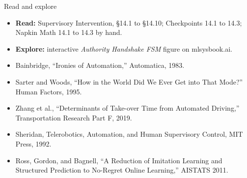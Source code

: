 \documentclass[aspectratio=169, 12pt]{beamer}
\begin{document}
\begin{frame}{Read and explore}
  \footnotesize
  \begin{itemize}\setlength{\itemsep}{0.05cm}
    \item \textbf{Read:} Supervisory Intervention, \S14.1 to \S14.10; Checkpoints 14.1 to 14.3; Napkin Math 14.1 to 14.3 by hand.
    \item \textbf{Explore:} interactive \emph{Authority Handshake FSM} figure on mlsysbook.ai.
    \item Bainbridge, ``Ironies of Automation,'' Automatica, 1983.
    \item Sarter and Woods, ``How in the World Did We Ever Get into That Mode?'' Human Factors, 1995.
    \item Zhang et al., ``Determinants of Take-over Time from Automated Driving,'' Transportation Research Part F, 2019.
    \item Sheridan, Telerobotics, Automation, and Human Supervisory Control, MIT Press, 1992.
    \item Ross, Gordon, and Bagnell, ``A Reduction of Imitation Learning and Structured Prediction to No-Regret Online Learning,'' AISTATS 2011.
  \end{itemize}
\end{frame}
\end{document}
